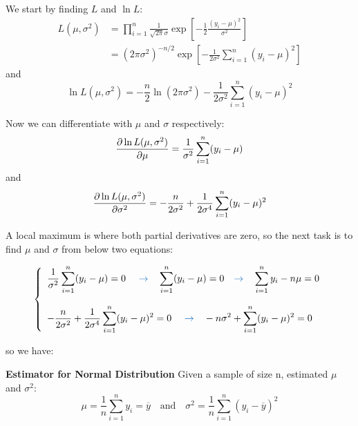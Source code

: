 \documentclass[11pt]{article}
\begin{document}
We start by finding $L$ and $\ln L$:
\[
\begin{aligned}
L(\mu, \sigma^2) 
	&= \prod _{i=1} ^n \frac{1}{\sqrt{2 \pi} \sigma} \exp \left[-\frac{1}{2} \frac{(y_i - \mu)^2}{\sigma^2} \right] \\
	&= (2 \pi \sigma^2 )^{-n/2} \exp \left[-\frac{1}{2 \sigma^2} \sum _{i=1} ^n (y_i - \mu)^2 \right] 
\end{aligned}
\]
and
\[
\ln L(\mu, \sigma^2) = -\frac{n}{2} \ln (2 \pi \sigma^2) - \frac{1}{2 \sigma^2} \sum _{i=1} ^n (y_i - \mu)^2 
\]

Now we can differentiate with $\mu$ and $\sigma$ respectively:
\[
\pdv {\ln L(\mu, \sigma^2)}{\mu} = \frac{1}{\sigma^2} \sum _{i=1} ^n (y_i - \mu)
\]
and
\[
\pdv {\ln L(\mu, \sigma^2)}{\sigma^2} = - \frac{n}{2\sigma^2} + \frac{1}{2\sigma^4} \sum _{i=1} ^n (y_i - \mu)^2 
\]

A local maximum is where both partial derivatives are zero,  so the next task is to find $\mu$ and $\sigma$ from below two equations:

\[ 
\left\{
\begin{array}{ll}
    \displaystyle   \frac{1}{\sigma^2} \sum _{i=1} ^n (y_i - \mu) = 0 \quad \ {\color{RoyalBlue} \to} \quad  \sum _{i=1} ^n (y_i - \mu) = 0 \quad {\color{RoyalBlue} \to} \quad  \sum _{i=1} ^n y_i - n\mu = 0 \\
    \hspace{5pt} \\
    \displaystyle- \frac{n}{2\sigma^2} + \frac{1}{2\sigma^4} \sum _{i=1} ^n (y_i - \mu)^2 = 0 \quad \ {\color{RoyalBlue} \to} \quad  - n \sigma^2 + \sum _{i=1} ^n (y_i - \mu)^2 = 0  \\
\end{array} 
\right. 
\]

so we have:

\begin{tcolorbox}[
	enhanced, 
	width=\textwidth, 
	fontupper=\normalsize,%
	drop fuzzy shadow southwest,
	boxrule=0.4pt,
	sharp corners,
	colframe=yellow!80!black,
	colback=yellow!10]
	
\textbf{\color{RoyalBlue} Estimator for Normal Distribution} \quad Given a sample of size n,  estimated $\mu$ and $\sigma^2$:
\[ 
\mu = \frac{1}{n} \sum _{i=1} ^n y_i = \overline{y} \quad \text{and} \quad \sigma^2 =  \frac{1}{n} \sum _{i=1} ^n (y_i - \overline{y} )^2 
\]

\end{tcolorbox}
\end{document}
